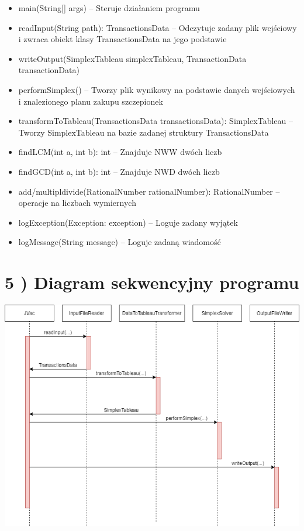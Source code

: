 \documentclass[]{article}
\begin{document}
    \begin{itemize}
        \item
        main(String{[}{]} args) -- Steruje działaniem programu
        \item
        readInput(String path): TransactionsData -- Odczytuje zadany plik
        wejściowy i zwraca obiekt klasy TransactionsData na jego podstawie
        \item
        writeOutput(SimplexTableau simplexTableau, TransactionData
        transactionData)
        \item
        performSimplex() -- Tworzy plik wynikowy na podstawie danych
        wejściowych i znalezionego planu zakupu szczepionek
        \item
        transformToTableau(TransactionsData transactionsData): SimplexTableau
        -- Tworzy SimplexTableau na bazie zadanej struktury TransactionsData
        \item
        findLCM(int a, int b): int -- Znajduje NWW dwóch liczb
        \item
        findGCD(int a, int b): int -- Znajduje NWD dwóch liczb
        \item
        add/multipldivide(RationalNumber rationalNumber): RationalNumber --
        operacje na liczbach wymiernych
        \item
        logException(Exception: exception) -- Loguje zadany wyjątek
        \item
        logMessage(String message) -- Loguje zadaną wiadomość
    \end{itemize}


    \section{5 ) Diagram sekwencyjny programu}

    \includegraphics[scale=0.5]{StateDiagram}
\end{document}
